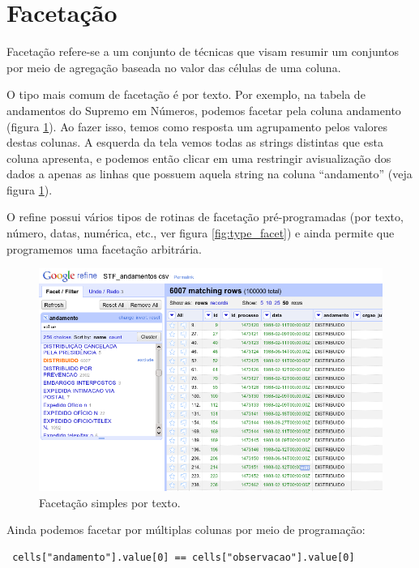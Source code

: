\documentclass[a4paper,10pt]{report}
\begin{document}
\section{Facetação}
Facetação refere-se a um conjunto de técnicas que visam resumir um conjuntos por meio de agregação baseada no valor das células de uma coluna.

O tipo mais comum de facetação é por texto. Por exemplo, na tabela de andamentos do Supremo em Números, podemos facetar pela coluna andamento (figura \ref{fig:text_faceting}). Ao fazer isso, temos como resposta um agrupamento pelos valores destas colunas. A esquerda da tela vemos todas as strings distintas que esta coluna apresenta, e podemos então clicar em uma restringir avisualização dos dados a apenas as linhas que possuem aquela string na coluna ``andamento'' (veja figura \ref{fig:text_faceting}).

O refine possui vários tipos de rotinas de facetação pré-programadas (por texto, número, datas, numérica, etc., ver figura \ref{fig:type_facet}) e ainda permite que programemos uma facetação arbitrária. 



\begin{figure}[h!]
 \includegraphics[width=12cm]{./text_faceting.png}
 \caption{Facetação simples por texto.}
 \label{fig:text_faceting}
\end{figure}

Ainda podemos facetar por múltiplas colunas por meio de programação:

\begin{lstlisting}
 cells["andamento"].value[0] == cells["observacao"].value[0]
\end{lstlisting}
\end{document}
